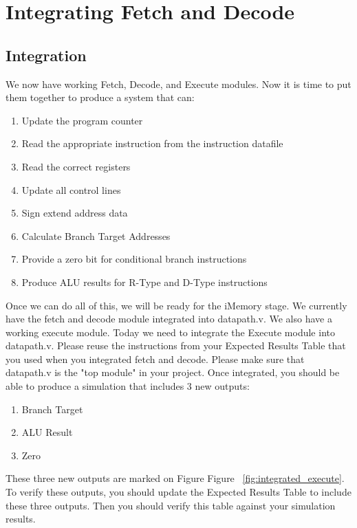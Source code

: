 \chapter{Integrating Fetch and Decode}

\section{Integration}
We now have working Fetch, Decode, and Execute modules.  Now it is time to put them together to produce a system that can:
\begin{enumerate}
	\item Update the program counter
	\item Read the appropriate instruction from the instruction datafile
	\item Read the correct registers
	\item Update all control lines
	\item Sign extend address data
	\item Calculate Branch Target Addresses
	\item Provide a zero bit for conditional branch instructions
	\item Produce ALU results for R-Type and D-Type instructions
\end{enumerate}

Once we can do all of this, we will be ready for the iMemory stage.  We currently have the fetch and decode module integrated into datapath.v.  We also have a working execute module.  Today we need to integrate the Execute module into datapath.v.  Please reuse the instructions from your Expected Results Table that you used when you integrated fetch and decode.  Please make sure that datapath.v is the "top module" in your project.  Once integrated, you should be able to produce a simulation that includes 3 new outputs:
\begin{enumerate}
	\item Branch Target
	\item ALU Result
	\item Zero
\end{enumerate}   

These three new outputs are marked on Figure Figure ~\ref{fig:integrated_execute}.  To verify these outputs, you should update the Expected Results Table to include these three outputs.  Then you should verify this table against your simulation results.

